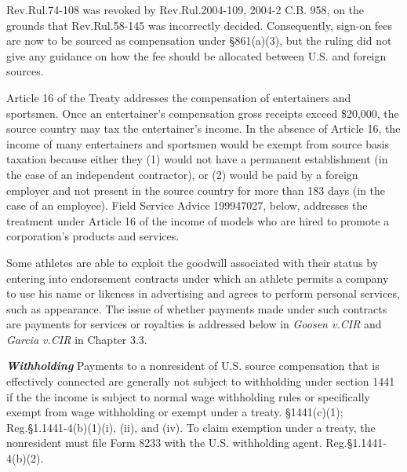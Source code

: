 Rev.\@\@ Rul.\@ 74-108 was revoked by Rev.\@\@ Rul.\@ 2004-109, 2004-2 C.B. 958, on the grounds that Rev.\@\@ Rul.\@ 58-145 was incorrectly decided.  Consequently, sign-on fees are now to be sourced as compensation under \S861(a)(3), but the ruling did not give any guidance on how the fee should be allocated between U.S. and foreign sources.     

Article 16 of the Treaty addresses the compensation of entertainers and sportsmen.  Once an entertainer's compensation gross receipts exceed \$20,000, the source country may tax the entertainer's income.  In the absence of Article 16, the income of many entertainers and sportsmen would be exempt from source basis taxation because either they (1) would not have a permanent establishment (in the case of an independent contractor), or (2) would be paid by a foreign employer and not present in the source country for more than 183 days (in the case of an employee).  Field Service Advice 199947027, below, addresses the treatment under Article 16 of the income of models who are hired to promote a corporation's products and services.    

 Some athletes are able to exploit the goodwill associated with their status by entering into endorsement contracts under which an athlete permits a company to use his name or likeness in advertising and agrees to perform personal services, such as appearance.  The issue of whether payments made under such contracts are payments for services or royalties is addressed below in \emph{Goosen v.\@ CIR} and \emph{Garcia v.\@ CIR} in Chapter 3.3.
 
 

\textbf{\emph{Withholding}} Payments to a nonresident of U.S. source compensation that is effectively connected are generally not subject to withholding under section 1441 if the the income is subject to normal wage withholding rules or specifically exempt from wage withholding or exempt under a treaty.  \S1441(c)(1); Reg.\@ \S 1.1441-4(b)(1)(i), (ii), and (iv).  To claim exemption under a treaty, the nonresident must file Form 8233 with the U.S. withholding agent.  Reg.\@ \S 1.1441-4(b)(2).

